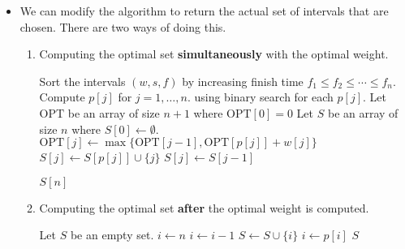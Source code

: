 \documentclass[a4paper,12pt]{article}
\begin{document}
\begin{itemize}
    \item We can modify the algorithm to return the actual set of intervals that are chosen. There are two ways of doing this.
    \begin{enumerate}
        \item Computing the optimal set \textbf{simultaneously} with the optimal weight.
        \begin{algorithmic}[1]
            \State Sort the intervals $(w,s,f)$ by increasing finish time $f_1\leq f_2\leq\cdots\leq f_n.$
            \State Compute $p[j]$ for $j=1,\dots,n.$ using binary search for each $p[j].$
            \State Let $\mathrm{OPT}$ be an array of size $n+1$ where $\mathrm{OPT}[0]=0$
            \State Let $S$ be an array of size $n$ where $S[0]\gets\emptyset.$
                \State $\mathrm{OPT}[j]\gets\max\{\mathrm{OPT}[j-1],\mathrm{OPT}[p[j]]+w[j]\}$
                    \State $S[j]\gets S[p[j]]\cup\{j\}$
                \Else
                    \State $S[j]\gets S[j-1]$
                \EndIf

            \EndFor
            \State \Return $S[n]$
            \EndProcedure
        \end{algorithmic}
        \item Computing the optimal set \textbf{after} the optimal weight is computed.
        \begin{algorithmic}[1]
            \State Let $S$ be an empty set.
            \State $i\gets n$
                    \State $i\gets i-1$ 
                \Else
                    \State $S\gets S\cup\{i\}$ 
                    \State $i\gets p[i]$ 
                \EndIf
            \EndWhile
            \State \Return $S$
            \EndProcedure
        \end{algorithmic}
    \end{enumerate}
\end{itemize}
\end{document}
